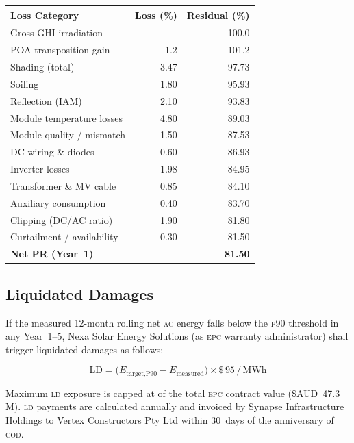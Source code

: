 \begin{center}
\begin{tabular}{@{} l r r @{}}
  \toprule
  \rowcolor{SolarMist}
  \textbf{Loss Category}              & \textbf{Loss (\%)} & \textbf{Residual (\%)} \\
  \midrule
  Gross GHI irradiation               &        &  100.0 \\
  POA transposition gain              & $-$1.2 &  101.2 \\
  Shading (total)                     & 3.47   &  97.73 \\
  Soiling                             & 1.80   &  95.93 \\
  Reflection (IAM)                    & 2.10   &  93.83 \\
  Module temperature losses           & 4.80   &  89.03 \\
  Module quality / mismatch           & 1.50   &  87.53 \\
  DC wiring \& diodes                 & 0.60   &  86.93 \\
  Inverter losses                     & 1.98   &  84.95 \\
  Transformer \& MV cable             & 0.85   &  84.10 \\
  Auxiliary consumption               & 0.40   &  83.70 \\
  Clipping (DC/AC ratio)              & 1.90   &  81.80 \\
  Curtailment / availability          & 0.30   &  81.50 \\
  \midrule
  \rowcolor{SolarMist}
  \textbf{Net PR (Year~1)}            & {---}    & \textbf{81.50} \\
  \bottomrule
\end{tabular}
\end{center}

\subsection{Liquidated Damages}

If the measured 12-month rolling net \textsc{ac} energy falls below the \textsc{p90} threshold
in any Year~1--5, Nexa Solar Energy Solutions (as \textsc{epc} warranty administrator) shall
trigger liquidated damages as follows:

\[
  \text{LD} = \bigl(E_{\text{target,P90}} - E_{\text{measured}}\bigr)
              \times \$\,95\,/\,\si{\mega\watt\hour}
\]

Maximum \textsc{ld} exposure is capped at  of the total \textsc{epc} contract
value (\$AUD~47.3\,M). \textsc{ld} payments are calculated annually and invoiced by
Synapse Infrastructure Holdings to Vertex Constructors Pty Ltd within 30~days of the
anniversary of \textsc{cod}.
